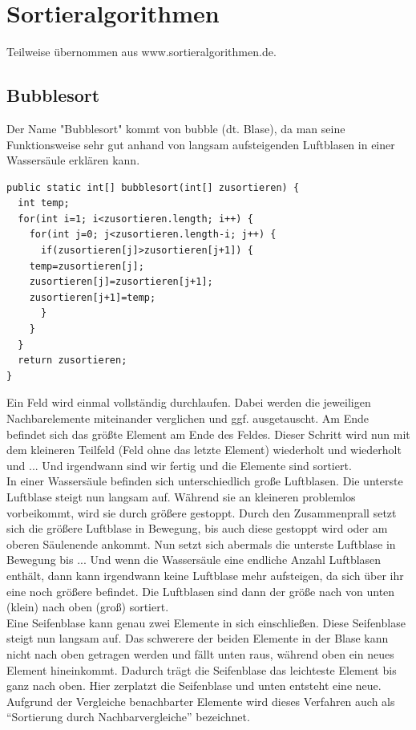 \documentclass[a4paper,10pt,DIV9, BCOR12mm, oneside,openright,openbib]{scrreprt}
\theoremstyle{definition}
\theoremstyle{plain}
\begin{document}
\chapter{Sortieralgorithmen}
Teilweise übernommen aus www.sortieralgorithmen.de.
\section{Bubblesort}
Der Name "Bubblesort" kommt von bubble (dt. Blase), da man seine Funktionsweise sehr gut anhand von langsam aufsteigenden Luftblasen in einer Wassersäule erklären kann.
\begin{lstlisting}[caption=Bubblesort]
public static int[] bubblesort(int[] zusortieren) {
  int temp;
  for(int i=1; i<zusortieren.length; i++) {
    for(int j=0; j<zusortieren.length-i; j++) {
      if(zusortieren[j]>zusortieren[j+1]) {
	temp=zusortieren[j];
	zusortieren[j]=zusortieren[j+1];
	zusortieren[j+1]=temp;
      }
    }
  }
  return zusortieren;
}
\end{lstlisting}
Ein Feld wird einmal vollständig durchlaufen. Dabei werden die jeweiligen Nachbarelemente miteinander verglichen und ggf. ausgetauscht. Am Ende befindet sich das größte Element am Ende des Feldes. Dieser Schritt wird nun mit dem kleineren Teilfeld (Feld ohne das letzte Element) wiederholt und wiederholt und ... Und irgendwann sind wir fertig und die Elemente sind sortiert.\\
In einer Wassersäule befinden sich unterschiedlich große Luftblasen. Die unterste Luftblase steigt nun langsam auf. Während sie an kleineren problemlos vorbeikommt, wird sie durch größere gestoppt. Durch den Zusammenprall setzt sich die größere Luftblase in Bewegung, bis auch diese gestoppt wird oder am oberen Säulenende ankommt. Nun setzt sich abermals die unterste Luftblase in Bewegung bis ... Und wenn die Wassersäule eine endliche Anzahl Luftblasen enthält, dann kann irgendwann keine Luftblase mehr aufsteigen, da sich über ihr eine noch größere befindet. Die Luftblasen sind dann der größe nach von unten (klein) nach oben (groß) sortiert.\\
Eine Seifenblase kann genau zwei Elemente in sich einschließen. Diese Seifenblase steigt nun langsam auf. Das schwerere der beiden Elemente in der Blase kann nicht nach oben getragen werden und fällt unten raus, während oben ein neues Element hineinkommt. Dadurch trägt die Seifenblase das leichteste Element bis ganz nach oben. Hier zerplatzt die Seifenblase und unten entsteht eine neue.\\
Aufgrund der Vergleiche benachbarter Elemente wird dieses Verfahren auch als ``Sortierung durch Nachbarvergleiche'' bezeichnet.
\end{document}

